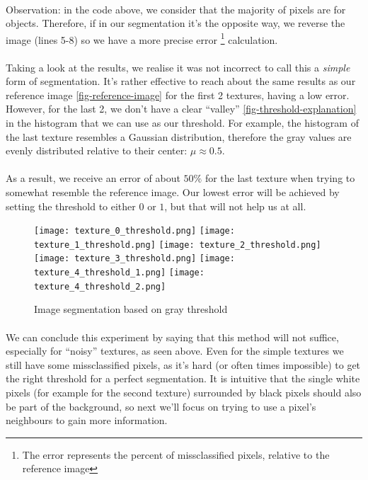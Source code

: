 \paragraph{}
Observation: in the code above, we consider that the majority of pixels are for objects.
Therefore, if in our segmentation it's the opposite way, we reverse the image (lines 5-8) so we have a more precise error \footnote{The error represents the percent of missclassified pixels, relative to the reference image} calculation.

\clearpage

\paragraph{}
Taking a look at the results, we realise it was not incorrect to call this a \emph{simple} form of segmentation.
It's rather effective to reach about the same results as our reference image \ref{fig-reference-image} for the first 2 textures, having a low error.
However, for the last 2, we don't have a clear ``valley'' \ref{fig-threshold-explanation} in the histogram that we can use as our threshold.
For example, the histogram of the last texture resembles a Gaussian distribution, therefore the gray values are evenly distributed relative to their center: $\mu\approx0.5$.
\paragraph{}
As a result, we receive an error of about $50\%$ for the last texture when trying to somewhat resemble the reference image.
Our lowest error will be achieved by setting the threshold to either $0$ or $1$, but that will not help us at all.

\begin{figure}[h]
    \centering
    \texttt{[image: texture\_0\_threshold.png]}
    \texttt{[image: texture\_1\_threshold.png]}
    \texttt{[image: texture\_2\_threshold.png]}
    \texttt{[image: texture\_3\_threshold.png]}
    \texttt{[image: texture\_4\_threshold\_1.png]}
    \texttt{[image: texture\_4\_threshold\_2.png]}
    \caption{Image segmentation based on gray threshold}
\end{figure}

\paragraph{}
We can conclude this experiment by saying that this method will not suffice, especially for ``noisy'' textures, as seen above.
Even for the simple textures we still have some missclassified pixels, as it's hard (or often times impossible) to get the right threshold for a perfect segmentation.
It is intuitive that the single white pixels (for example for the second texture) surrounded by black pixels should also be part of the background, so next we'll focus on trying to use a pixel's neighbours to gain more information.


